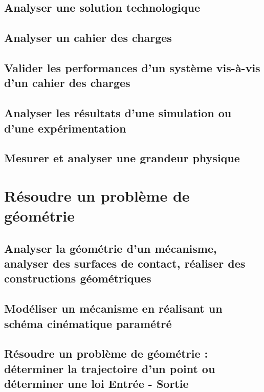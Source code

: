 \clearpage 
\newpage 
\section{Analyser une solution technologique} 
\clearpage 
\newpage 
\section{Analyser un cahier des charges} 
\clearpage 
\newpage 
\section{Valider les performances d'un système vis-à-vis d'un cahier des charges} 
\clearpage 
\newpage 
\section{Analyser les résultats d'une simulation ou d'une expérimentation} 
\clearpage 
\newpage 
\section{Mesurer et analyser une grandeur physique} 
\clearpage 
\newpage 
\setchapterpreamble[u]{\margintoc} 
\chapter{Résoudre un problème de géométrie} 
\section{Analyser la géométrie d'un mécanisme, analyser des surfaces de contact, réaliser des constructions géométriques} 
\clearpage 
\newpage 
\section{Modéliser un mécanisme en réalisant un schéma cinématique paramétré} 
\clearpage 
\newpage 
\section{Résoudre un problème de géométrie : déterminer la trajectoire d'un point ou déterminer une loi Entrée - Sortie} 
\graphicspath{{\repStyle/png/}{../GEO/GEO-03/10_PompePalette/images/}} 
 
 
\graphicspath{{\repStyle/png/}{../GEO/GEO-03/11_PompePistonsRadiaux/images/}} 
 
 
